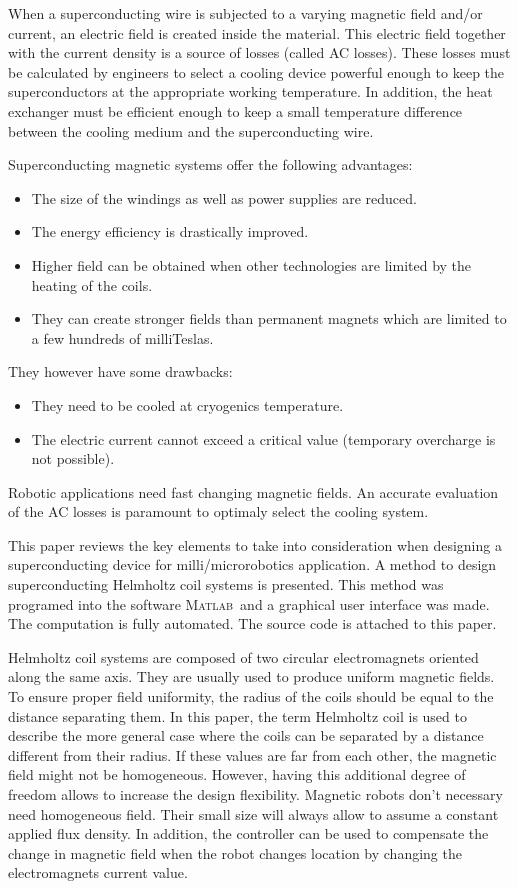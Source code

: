 \documentclass{ws-jmrr}
\newcommand{\MATLAB}{\textsc{Matlab}}
\begin{document}
\begin{multicols}{2}
When a superconducting wire is subjected to a varying magnetic field and/or current, an electric field is created inside the material. This electric field together with the current density is a source of losses (called AC losses). These losses must be calculated by engineers to select a cooling device powerful enough to keep the superconductors at the appropriate working temperature. In addition, the heat exchanger must be efficient enough to keep a small temperature difference between the cooling medium and the superconducting wire.\par
Superconducting magnetic systems offer the following advantages:
\begin{itemize}[leftmargin=*]
\item The size of the windings as well as power supplies are reduced.
\item The energy efficiency is drastically improved.
\item Higher field can be obtained when other technologies are limited by the heating of the coils.
\item They can create stronger fields than permanent magnets which are limited to a few hundreds of milliTeslas.
\end{itemize}
They however have some drawbacks:
\begin{itemize}[leftmargin=*]
\item They need to be cooled at cryogenics temperature.
\item The electric current cannot exceed a critical value (temporary overcharge is not possible).
\end{itemize}
Robotic applications need fast changing magnetic fields. An accurate evaluation of the AC losses is paramount to optimaly select the cooling system.\par
This paper reviews the key elements to take into consideration when designing a superconducting device for milli/microrobotics application. A method to design superconducting Helmholtz coil systems is presented. This method was programed into the software \MATLAB ~and a graphical user interface was made. The computation is fully automated. The source code is attached to this paper.\par

Helmholtz coil systems are composed of two circular electromagnets oriented along the same axis. They are usually used to produce uniform magnetic fields. To ensure proper field uniformity, the radius of the coils should be equal to the distance separating them. In this paper, the term Helmholtz coil is used to describe the more general case where the coils can be separated by a distance different from their radius. If these values are far from each other, the magnetic field might not be homogeneous. However, having this additional degree of freedom allows to increase the design flexibility. Magnetic robots don't necessary need homogeneous field. Their small size will always allow to assume a constant applied flux density. In addition, the controller can be used to compensate the change in magnetic field when the robot changes location by changing the electromagnets current value.


\end{multicols}
\end{document}
